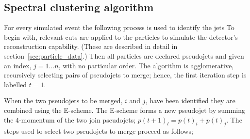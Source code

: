 \subsection{Spectral clustering algorithm}\label{sec:spectralmethodalgo}
    For every simulated event the following process is used to identify the jets
    To begin with, relevant cuts are applied to the particles to simulate the detector's
    reconstruction capability.
    (These are described in detail in section~\ref{sec:particle_data}.)
    Then all particles are declared pseudojets  and given an index, \(j = 1 \dots n\), with no particular order.
    The algorithm is agglomerative, recursively selecting pairs of pseudojets to merge;
    hence, the first iteration step is labelled \(t=1\).

    When the two pseudojets to be merged, \(i\) and \(j\), have been identified they are combined
    using the E-scheme.
    The E-scheme forms a new pseudojet by summing the \(4\)-momentum of the two join pseudojets;
    \(p(t+1)_l = p(t)_i + p(t)_j\).
    The steps used to select two pseudojets to merge proceed as follows;


